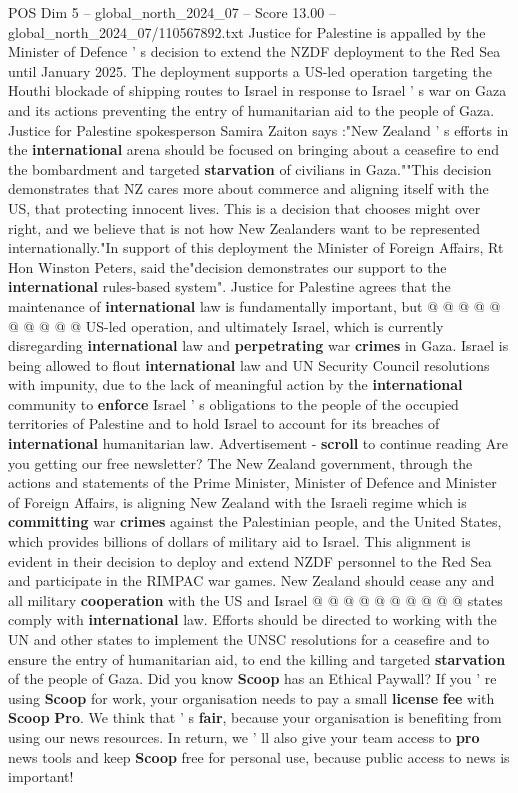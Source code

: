 \begin{textsample}{POS Dim 5 – global\_north\_2024\_07 – Score 13.00 – global\_north\_2024\_07/110567892.txt}  \label{ex:f5_pos_309}
Justice for Palestine is appalled by the Minister of Defence ' s decision to extend the NZDF deployment to the Red Sea until January 2025.
The deployment supports a US-led operation targeting the Houthi blockade of shipping routes to Israel in response to Israel ' s war on Gaza and its actions preventing the entry of humanitarian aid to the people of Gaza.
Justice for Palestine spokesperson Samira Zaiton says :"New Zealand ' s efforts in the \textbf{international} arena should be focused on bringing about a ceasefire to end the bombardment and targeted \textbf{starvation} of civilians in Gaza.""This decision demonstrates that NZ cares more about commerce and aligning itself with the US, that protecting innocent lives.
This is a decision that chooses might over right, and we believe that is not how New Zealanders want to be represented internationally."In support of this deployment the Minister of Foreign Affairs, Rt Hon Winston Peters, said the"decision demonstrates our support to the \textbf{international} rules-based system".
Justice for Palestine agrees that the maintenance of \textbf{international} law is fundamentally important, but @ @ @ @ @ @ @ @ @ @ US-led operation, and ultimately Israel, which is currently disregarding \textbf{international} law and \textbf{perpetrating} war \textbf{crimes} in Gaza.
Israel is being allowed to flout \textbf{international} law and UN Security Council resolutions with impunity, due to the lack of meaningful action by the \textbf{international} community to \textbf{enforce} Israel ' s obligations to the people of the occupied territories of Palestine and to hold Israel to account for its breaches of \textbf{international} humanitarian law.
Advertisement - \textbf{scroll} to continue reading Are you getting our free newsletter?
The New Zealand government, through the actions and statements of the Prime Minister, Minister of Defence and Minister of Foreign Affairs, is aligning New Zealand with the Israeli regime which is \textbf{committing} war \textbf{crimes} against the Palestinian people, and the United States, which provides billions of dollars of military aid to Israel.
This alignment is evident in their decision to deploy and extend NZDF personnel to the Red Sea and participate in the RIMPAC war games.
New Zealand should cease any and all military \textbf{cooperation} with the US and Israel @ @ @ @ @ @ @ @ @ @ states comply with \textbf{international} law.
Efforts should be directed to working with the UN and other states to implement the UNSC resolutions for a ceasefire and to ensure the entry of humanitarian aid, to end the killing and targeted \textbf{starvation} of the people of Gaza.
Did you know \textbf{Scoop} has an Ethical Paywall?
If you ' re using \textbf{Scoop} for work, your organisation needs to pay a small \textbf{license} \textbf{fee} with \textbf{Scoop} \textbf{Pro}.
We think that ' s \textbf{fair}, because your organisation is benefiting from using our news resources.
In return, we ' ll also give your team access to \textbf{pro} news tools and keep \textbf{Scoop} free for personal use, because public access to news is important!


\end{textsample}
